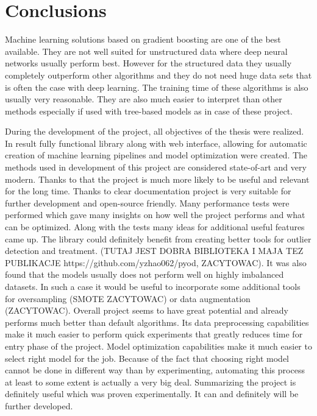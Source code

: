 \documentclass[a4paper,twoside,12pt]{book}
\begin{document}
\chapter{Conclusions}
Machine learning solutions based on gradient boosting are one of the best available. They are not well suited for unstructured data where deep neural networks usually perform best. However for the structured data they usually completely outperform other algorithms and they do not need huge data sets that is often the case with deep learning. The training time of these algorithms is also usually very reasonable. They are also much easier to interpret than other methods especially if used with tree-based models as in case of these project.

During the development of  the project, all objectives of the thesis were realized. 
In result fully functional library along with web interface, allowing for automatic creation of machine learning pipelines and model optimization were created.
The methods used in development of this project are considered state-of-art and very modern. Thanks to that the project is much more likely to be useful and relevant for the long time.
Thanks to clear documentation project is very suitable for further development and open-source friendly. Many performance tests were performed which gave many insights on how well the project performs and what can be optimized.
Along with the tests many ideas for additional useful features came up. The library could definitely benefit from creating better tools for outlier detection and treatment. (TUTAJ JEST DOBRA BIBLIOTEKA I MAJA TEZ PUBLIKACJE https://github.com/yzhao062/pyod, ZACYTOWAC).
It was also found that the models usually does not perform well on highly imbalanced datasets. In such a case it would be useful to incorporate some additional tools for oversampling (SMOTE ZACYTOWAC) or data augmentation (ZACYTOWAC).
Overall project seems to have great potential and already performs much better than default algorithms. Its data preprocessing capabilities make it much easier to perform quick experiments that greatly reduces time for entry phase of the project. Model optimization capabilities make it much easier to select right model for the job. Because of the fact that choosing right model cannot be done in different way than by experimenting, automating this process at least to some extent is actually a very big deal.
Summarizing the project is definitely useful which was proven experimentally. It can and definitely will be further developed.
\end{document}
